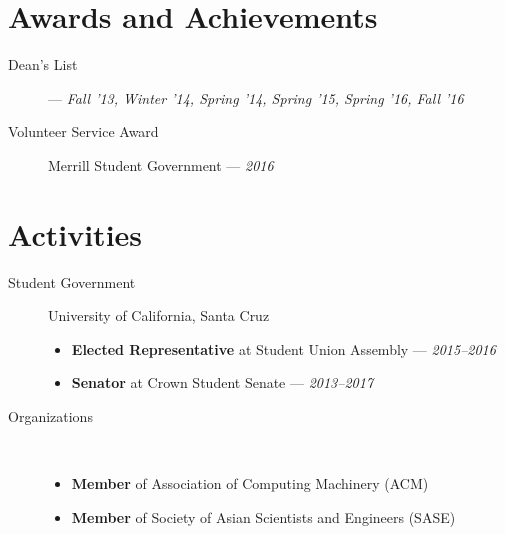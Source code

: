 \documentclass[11pt]{article}
\begin{document}
\section*{Awards and Achievements}
\begin{description}
  \item[Dean's List] --- \textit{Fall '13, Winter '14, Spring '14, Spring '15,
    Spring '16, Fall '16}
\item[Volunteer Service Award] Merrill Student Government --- \textit{2016}
\end{description}

\section*{Activities}
\begin{description}
  \item[Student Government] University of California, Santa Cruz
    \begin{itemize}
      \item \textbf{Elected Representative} at Student Union Assembly ---
        \textit{2015--2016}
      \item \textbf{Senator} at Crown Student Senate --- \textit{2013--2017}
    \end{itemize}
  \item[Organizations] ~
    \begin{itemize}
      \item \textbf{Member} of Association of Computing Machinery (ACM)
      \item \textbf{Member} of Society of Asian Scientists and Engineers (SASE)
    \end{itemize}
\end{description}
\end{document}
